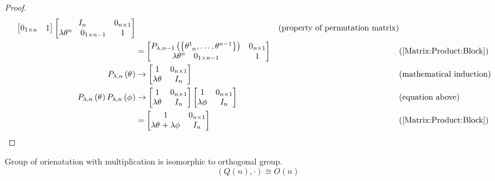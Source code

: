 \documentclass[../main.tex]{subfiles}
\begin{document}
\begin{proof}
\begin{align*}
\begin{bmatrix}
0_{1\times n}&1\\
\end{bmatrix}
\begin{bmatrix}
{I}_{n}&0_{n\times1}\\
\begin{matrix*}\lambda\tensor{\theta}{^n}&0_{1\times n-1}\end{matrix*}&1\\
\end{bmatrix}&&\text{(property of permutation matrix)}\\
&=
\begin{bmatrix}
P_{\lambda,n-1}\left(\left\{\tensor{\theta}{^1_{n}},\dots,\tensor{\theta}{^{n-1}}\right\}\right)&0_{n\times1}\\
\begin{matrix*}\lambda\tensor{\theta}{^n}&0_{1\times n-1}\end{matrix*}&1\\
\end{bmatrix}&&\text{(\cref{Matrix:Product:Block})}\\
P_{\lambda,n}\left(\tensor{\theta}{}\right)
&\to
\begin{bmatrix}
1&0_{n\times1}\\
\lambda\tensor{\theta}{}&I_n\\
\end{bmatrix}&&\text{(mathematical induction)}\\
P_{\lambda,n}\left(\tensor{\theta}{}\right) P_{\lambda,n}\left(\tensor{\phi}{}\right)
&\to
\begin{bmatrix}
1&0_{n\times1}\\
\lambda\tensor{\theta}{}&I_n\\
\end{bmatrix}\begin{bmatrix}
1&0_{n\times1}\\
\lambda\tensor{\phi}{}&I_n\\
\end{bmatrix}&&\text{(equation above)}\\
&=
\begin{bmatrix}
1&0_{n\times1}\\
\lambda\tensor{\theta}{}+\lambda\tensor{\phi}{}&I_n\\
\end{bmatrix}&&\text{(\cref{Matrix:Product:Block})}
\end{align*}
\end{proof}
\begin{proposition}
Group of orienatation with multiplication is isomorphic to orthogonal group.
\[
\left(Q\left(n\right),\cdot\right)\cong O\left(n\right)
\]
\end{proposition}
\end{document}

